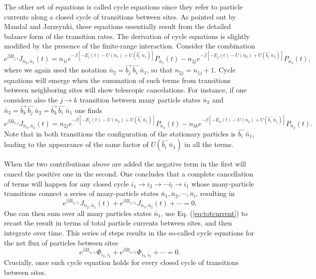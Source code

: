 \documentclass[aps,pre,showpacs,amsmath,amssymb,amsfonts,superscriptaddress,onecolumn,longbibliography]{revtex4-1}
\begin{document}
The other set of equations is called cycle equations since they refer to particle currents along
a closed cycle of transitions between sites. As pointed out by Mandal and Jarzsynki, these equations essentially result
from the detailed balance form of the transition rates.
The derivation of cycle equations is slightly modified by the presence of the finite-range interaction. Consider the combination
\begin{equation*}
  e^{\beta B_{j,i}} J_{\bar{n}_2 ,\bar{n}_1}(t) = n_{1i} e^{-\beta \left[-E_i(t) - U(\bar{n}_1)+U(\hat{b}_i^- \bar{n}_1) \right]} P_{\bar{n}_1} (t)-n_{2j} e^{-\beta \left[ -E_j(t)-U(\bar{n}_2 )+U(\hat{b}_i^- \bar{n}_1)\right]} P_{\bar{n}_2}(t) ,
\end{equation*}
where we again used the notation $\bar{n}_2 = \hat{b}_j^+ \hat{b}_i^- \bar{n}_1$, so that $n_{2j}=n_{1j}+1$.
Cycle equations will emerge when the summation of such terms from transitions between neighboring sites will show telescopic cancelations. For instance, if one considers also
the $j\rightarrow k$ transition between many particle states $\bar{n}_2$ and $ \bar{n}_3 =\hat{b}_k^+ \hat{b}_j^- \bar{n}_2 = \hat{b}_k^+ \hat{b}_i^- \bar{n}_1$ one finds
\begin{equation*}
  e^{\beta B_{k,j}} J_{\bar{n}_3,\bar{n}_2}(t) = n_{2j} e^{-\beta \left[ -E_j(t)-U(\bar{n}_2)+U(\hat{b}_i^- \bar{n}_1)\right]} P_{\bar{n}_2}(t)-n_{3k} e^{-\beta \left[ -E_k(t)-U(\bar{n}_3)+U(\hat{b}_i^- \bar{n}_1)\right]} P_{\bar{n}_2}(t).
\end{equation*}
Note that in both transitions the configuration of the stationary particles is $\hat{b}_i^- \bar{n}_1$, leading to the appearance of the same factor of $U(\hat{b}_i^- \bar{n}_1)$
in all the terms.

When the two contributions above are added the negative term in the first will cancel the positive one in the second. One concludes that a complete cancellation
of terms
will happen for any closed cycle $i_1\rightarrow i_2 \rightarrow \cdots i_l \rightarrow i_1$ whose many-particle transitions connect a series of many-particle states $\bar{n}_1, \bar{n}_2, \cdots ,\bar{n}_l$, resulting in
\begin{equation}\label{eq:intermediate}
  e^{\beta B_{i_2, i_1}}J_{\bar{n}_2,\bar{n}_1}(t)+e^{\beta B_{i_3, i_2}}J_{\bar{n}_3,\bar{n}_2}(t)+\cdots = 0.
\end{equation}
One can then sum over all many particles states $\bar{n}_1$, use Eq. (\ref{eq:totcurrent}) to recast the result
in terms of total particle currents between sites,
and then integrate over time.
This series of steps results in the so-called  cycle equations for the net flux of particles between sites
\begin{equation}
\label{eq:cycles}
  e^{\beta B_{i_2,i_1}} \Phi_{i_2,i_1} +  e^{\beta B_{i_3,i_2}} \Phi_{i_3,i_2}+\cdots =0.
\end{equation}
Crucially, once such cycle equation holds for every closed cycle of transitions between sites.
\end{document}
